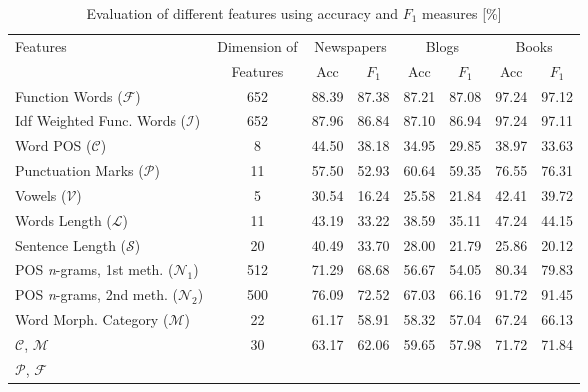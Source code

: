 \documentclass{llncs}
\begin{document}
\begin{table*}[htb]
\normalsize\caption{Evaluation of different features using accuracy and $F_1$ measures [\%]}
\scriptsize
\centering
\begin{tabular}{l c c c c c c c}%
\toprule%
Features & Dimension of & \multicolumn{2}{c}{Newspapers} &
\multicolumn{2}{c}{Blogs} & \multicolumn{2}{c}{Books}\\ & Features & \hspace{5pt} Acc
\hspace{5pt} & \hspace{5pt} $F_1$ \hspace{5pt} & \hspace{5pt} Acc \hspace{5pt} & \hspace{5pt} $F_1$ \hspace{5pt} & \hspace{5pt} Acc \hspace{5pt} & \hspace{5pt} $F_1$ \hspace{5pt}\\
\midrule
Function Words ($\mathcal{F}$) & 652 & 88.39 & 87.38 & 87.21 & 87.08 & 97.24 &
97.12 \\ Idf Weighted Func. Words ($\mathcal{I}$) & 652 & 87.96 & 86.84 & 87.10
& 86.94 & 97.24 & 97.11 \\ Word POS ($\mathcal{C}$) & 8 & 44.50 & 38.18 & 34.95
& 29.85 & 38.97 & 33.63 \\ Punctuation Marks ($\mathcal{P}$) & 11 & 57.50 &
52.93 & 60.64 & 59.35 & 76.55 & 76.31 \\ Vowels ($\mathcal{V}$) & 5 & 30.54 & 16.24 &
25.58 & 21.84 & 42.41 & 39.72 \\ Words Length ($\mathcal{L}$) & 11 & 43.19 &
33.22 & 38.59 & 35.11 & 47.24 & 44.15 \\ Sentence Length ($\mathcal{S}$) & 20 &
40.49 & 33.70 & 28.00 & 21.79 & 25.86 & 20.12 \\ POS \emph{n}-grams, 1st
meth. ($\mathcal{N}_1$) & 512 & 71.29 & 68.68 & 56.67 & 54.05 & 80.34 & 79.83 \\
POS \emph{n}-grams, 2nd meth. ($\mathcal{N}_2$) & 500 & 76.09 & 72.52 & 67.03 &
66.16 & 91.72 & 91.45 \\ Word Morph. Category ($\mathcal{M}$) & 22 & 61.17
& 58.91 & 58.32 & 57.04 & 67.24 & 66.13 \\ $\mathcal{C}$, $\mathcal{M}$ & 30 &
63.17 & 62.06 & 59.65 & 57.98 & 71.72 & 71.84 \\ $\mathcal{P}$, $\mathcal{F}$ &

\end{tabular}
\end{table*}
\end{document}
